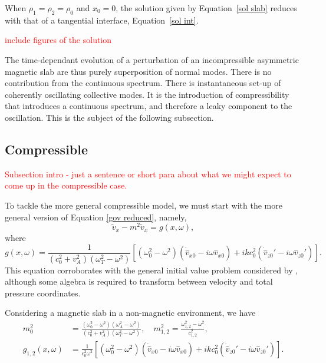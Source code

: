 \documentclass[12pt, draft]{../style-files/ociamthesis}
\begin{document}
When $\rho_1 = \rho_2 = \rho_0$ and $x_0 = 0$, the solution given by Equation~\eqref{sol slab} reduces with that of a tangential interface, Equation~\eqref{sol int}.

\textcolor{red}{include figures of the solution}

The time-dependant evolution of a perturbation of an incompressible asymmetric magnetic slab are thus purely superposition of normal modes. There is no contribution from the continuous spectrum. There is instantaneous set-up of coherently oscillating collective modes. It is the introduction of compressibility that introduces a continuous spectrum, and therefore a leaky component to the oscillation. This is the subject of the following subsection.


\subsection{Compressible}

\textcolor{red}{Subsection intro - just a sentence or short para about what we might expect to come up in the compressible case.}

To tackle the more general compressible model, we must start with the more general version of Equation \eqref{gov reduced}, namely,
\begin{equation}
\tilde{v}_x - m^2 \tilde{v}_x = g(x, \omega),
\end{equation}
where
\begin{equation}
g(x, \omega) = \frac{1}{(c_0^2 + v_A^2)(\omega_T^2 - \omega^2)}\left[ (\omega_0^2 - \omega^2)\left(\dot{\hat{v}}_{x0} - i\omega \hat{v}_{x0}\right) + ikc_0^2\left( \dot{\hat{v}}_{z0}' - i\omega \hat{v}_{z0}'\right) \right].
\end{equation}
This equation corroborates with the general initial value problem considered by \cite{and_etal07}, although some algebra is required to transform between velocity and total pressure coordinates.

Considering a magnetic slab in a non-magnetic environment, we have
\begin{align}
m_0^2 &= \frac{(\omega_0^2 - \omega^2)(\omega_A^2 - \omega^2)}{(c_0^2 + v_A^2)(\omega_T^2 - \omega^2)}, \quad m_{1,2}^2 = \frac{\omega_{1,2}^2 - \omega^2}{c_{1,2}^2}, \\
g_{1,2}(x, \omega) &= \frac{1}{c_0^2\omega^2} \left[ (\omega_0^2 - \omega^2)\left(\dot{\hat{v}}_{x0} - i\omega \hat{v}_{x0}\right) + ikc_0^2\left( \dot{\hat{v}}_{z0}' - i\omega \hat{v}_{z0}'\right) \right].
\end{align}
\end{document}
